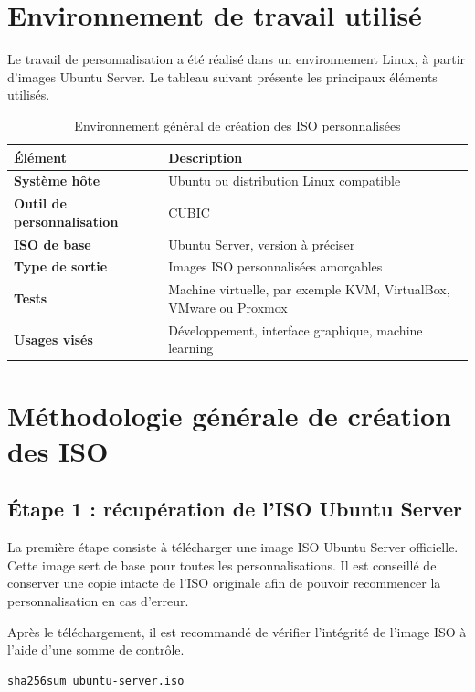 \documentclass[12pt,a4paper]{article}
\begin{document}
\section{Environnement de travail utilisé}

Le travail de personnalisation a été réalisé dans un environnement Linux, à partir d'images Ubuntu Server. Le tableau suivant présente les principaux éléments utilisés.

\begin{table}[H]
\centering
\begin{tabular}{>{\bfseries}p{5cm}p{9cm}}
\toprule
Élément & Description \\
\midrule
Système hôte & Ubuntu ou distribution Linux compatible \\
Outil de personnalisation & CUBIC \\
ISO de base & Ubuntu Server, version à préciser \\
Type de sortie & Images ISO personnalisées amorçables \\
Tests & Machine virtuelle, par exemple KVM, VirtualBox, VMware ou Proxmox \\
Usages visés & Développement, interface graphique, machine learning \\
\bottomrule
\end{tabular}
\caption{Environnement général de création des ISO personnalisées}
\end{table}

\section{Méthodologie générale de création des ISO}

\subsection{Étape 1 : récupération de l'ISO Ubuntu Server}

La première étape consiste à télécharger une image ISO Ubuntu Server officielle. Cette image sert de base pour toutes les personnalisations. Il est conseillé de conserver une copie intacte de l'ISO originale afin de pouvoir recommencer la personnalisation en cas d'erreur.

Après le téléchargement, il est recommandé de vérifier l'intégrité de l'image ISO à l'aide d'une somme de contrôle.

\begin{lstlisting}
sha256sum ubuntu-server.iso
\end{lstlisting}
\end{document}
